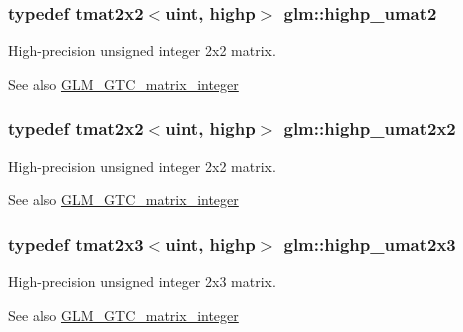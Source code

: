 \subsubsection[{highp\+\_\+umat2}]{\setlength{\rightskip}{0pt plus 5cm}typedef tmat2x2$<${\bf uint}, highp$>$ {\bf glm\+::highp\+\_\+umat2}}\label{group__gtc__matrix__integer_ga113fe97aa8688eaa287a02f8362f3e47}
High-\/precision unsigned integer 2x2 matrix. \begin{DoxySeeAlso}{See also}
\hyperlink{group__gtc__matrix__integer}{G\+L\+M\+\_\+\+G\+T\+C\+\_\+matrix\+\_\+integer} 
\end{DoxySeeAlso}
\hypertarget{group__gtc__matrix__integer_gaeb546847abfc7c3c09ea8172987ebb16}{}
\subsubsection[{highp\+\_\+umat2x2}]{\setlength{\rightskip}{0pt plus 5cm}typedef tmat2x2$<${\bf uint}, highp$>$ {\bf glm\+::highp\+\_\+umat2x2}}\label{group__gtc__matrix__integer_gaeb546847abfc7c3c09ea8172987ebb16}
High-\/precision unsigned integer 2x2 matrix. \begin{DoxySeeAlso}{See also}
\hyperlink{group__gtc__matrix__integer}{G\+L\+M\+\_\+\+G\+T\+C\+\_\+matrix\+\_\+integer} 
\end{DoxySeeAlso}
\hypertarget{group__gtc__matrix__integer_gab058a0a12ea7f604d92baeb7a0e54f3b}{}
\subsubsection[{highp\+\_\+umat2x3}]{\setlength{\rightskip}{0pt plus 5cm}typedef tmat2x3$<${\bf uint}, highp$>$ {\bf glm\+::highp\+\_\+umat2x3}}\label{group__gtc__matrix__integer_gab058a0a12ea7f604d92baeb7a0e54f3b}
High-\/precision unsigned integer 2x3 matrix. \begin{DoxySeeAlso}{See also}
\hyperlink{group__gtc__matrix__integer}{G\+L\+M\+\_\+\+G\+T\+C\+\_\+matrix\+\_\+integer} 
\end{DoxySeeAlso}
\hypertarget{group__gtc__matrix__integer_gafcec07e857ea0445d93680411e86482c}{}
